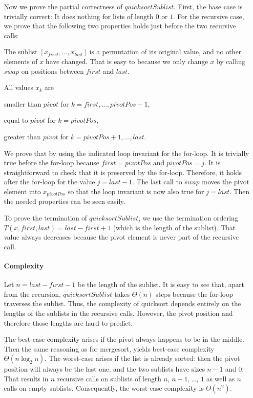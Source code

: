 Now we prove the partial correctness of $quicksortSublist$.
First, the base case is trivially correct: It does nothing for lists of length $0$ or $1$.
For the recursive case, we prove that the following two properties holds just before the two recursive calls:
\begin{compactitem}
 \item The sublist $[x_{first},\ldots,x_{last}]$ is a permutation of its original value, and no other elements of $x$ have changed.
  That is easy to because we only change $x$ by calling $swap$ on positions between $first$ and $last$.
 \item All values $x_k$ are
  \begin{compactitem}
    \item smaller than $pivot$ for $k=first,\ldots,pivotPos-1$,
    \item equal to $pivot$ for $k=pivotPos$,
    \item greater than $pivot$ for $k=pivotPos+1,\ldots,last$.
  \end{compactitem}
  We prove that by using the indicated loop invariant for the for-loop.
  It is trivially true before the for-loop because $first=pivotPos$ and $pivotPos=j$.
  It is straightforward to check that it is preserved by the for-loop.
  Therefore, it holds after the for-loop for the value $j=last-1$.
  The last call to $swap$ moves the pivot element into $x_{pivotPos}$ so that the loop invariant is now also true for $j=last$.
  Then the needed properties can be seen easily.
\end{compactitem}
\medskip

To prove the termination of $quicksortSublist$, we use the termination ordering $T(x,first,last)=last-first+1$ (which is the length of the sublist).
That value always decreases because the pivot element is never part of the recursive call.

\paragraph{Complexity}
Let $n=last-first-1$ be the length of the sublist.
It is easy to see that, apart from the recursion, $quicksortSublist$ takes $\Theta(n)$ steps because the for-loop traverses the sublist.
Thus, the complexity of quicksort depends entirely on the lengths of the sublists in the recursive calls.
However, the pivot position and therefore those lengths are hard to predict.

The best-case complexity arises if the pivot always happens to be in the middle.
Then the same reasoning as for mergesort, yields best-case complexity $\Theta(n\log_2 n)$.
The worst-case arises if the list is already sorted: then the pivot position will always be the last one, and the two sublists have sizes $n-1$ and $0$.
That results in $n$ recursive calls on sublists of length $n$, $n-1$, \ldots, $1$ as well as $n$ calls on empty sublists.
Consequently, the worst-case complexity is $\Theta(n^2)$.

